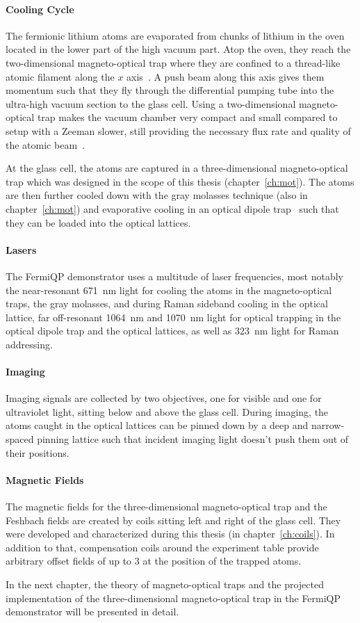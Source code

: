 \paragraph{Cooling Cycle}
The fermionic lithium atoms are evaporated from chunks of lithium in the oven located in the lower part of the high vacuum part. Atop the oven, they reach the two-dimensional magneto-optical trap where they are confined to a thread-like atomic filament along the $x$ axis~\cite{qesja_design_2022}.  A push beam along this axis gives them momentum such that they fly through the differential pumping tube into the ultra-high vacuum section to the glass cell. Using a two-dimensional magneto-optical trap makes the vacuum chamber very compact and small compared to setup with a Zeeman slower, still providing the necessary flux rate and quality of the atomic beam~\cite{tiecke_high-flux_2009}.

At the glass cell, the atoms are captured in a three-dimensional magneto-optical trap which was designed in the scope of this thesis (chapter~\ref{ch:mot}). The atoms are then further cooled down with the gray molasses technique (also in chapter~\ref{ch:mot}) and evaporative cooling in an optical dipole trap~\cite{sun_construction_2022} such that they can be loaded into the optical lattices.

\paragraph{Lasers}
The FermiQP demonstrator uses a multitude of laser frequencies, most notably the near-resonant \SI[]{671}{\nano\meter} light for cooling the atoms in the magneto-optical traps, the gray molasses, and during Raman sideband cooling in the optical lattice, far off-resonant \SI[]{1064}{\nano\meter} and \SI[]{1070}{\nano\meter}  light for optical trapping in the optical dipole trap and the optical lattices, as well as \SI[]{323}{\nano\meter} light for Raman addressing.

\paragraph{Imaging}
Imaging signals are collected by two objectives, one for visible and one for ultraviolet light, sitting below and above the glass cell. During imaging, the atoms caught in the optical lattices can be pinned down by a deep and narrow-spaced pinning lattice such that incident imaging light doesn't push them out of their positions.

\paragraph{Magnetic Fields}
The magnetic fields for the three-dimensional magneto-optical trap and the Feshbach fields are created by coils sitting left and right of the glass cell. They were developed and characterized during this thesis (in chapter~\ref{ch:coils}). In addition to that, compensation coils around the experiment table provide arbitrary offset fields of up to \SI[]{3}{\gauss} at the position of the trapped atoms.

\null

In the next chapter, the theory of magneto-optical traps and the projected implementation of the three-dimensional magneto-optical trap in the FermiQP demonstrator will be presented in detail.